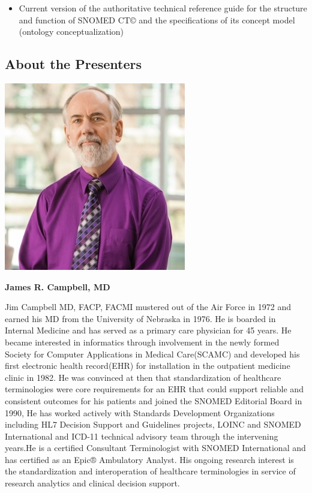 \documentclass[
]{journal}
\providecommand{\tightlist}{%
  \setlength{\itemsep}{0pt}\setlength{\parskip}{0pt}}
\begin{document}
\begin{itemize}
  \begin{itemize}
  \tightlist
  \item
    Current version of the authoritative technical reference guide for the structure and function of SNOMED CT© and the specifications of its concept model (ontology conceptualization)
  \end{itemize}
\end{itemize}

\hypertarget{about-the-presenters}{%
\subsection{About the Presenters}\label{about-the-presenters}}

\begin{flushleft}\includegraphics[width=0.5\linewidth]{assets/biography/jamescampbell} \end{flushleft}

\textbf{James R. Campbell, MD}

Jim Campbell MD, FACP, FACMI mustered out of the Air Force in 1972 and earned his MD from the University of Nebraska in 1976. He is boarded in Internal Medicine and has served as a primary care physician for 45 years. He became interested in informatics through involvement in the newly formed Society for Computer Applications in Medical Care(SCAMC) and developed his first electronic health record(EHR) for installation in the outpatient medicine clinic in 1982. He was convinced at then that standardization of healthcare terminologies were core requirements for an EHR that could support reliable and consistent outcomes for his patients and joined the SNOMED Editorial Board in 1990, He has worked actively with Standards Development Organizations including HL7 Decision Support and Guidelines projects, LOINC and SNOMED International and ICD-11 technical advisory team through the intervening years.He is a certified Consultant Terminologist with SNOMED International and has certified as an Epic® Ambulatory Analyst. His ongoing research interest is the standardization and interoperation of healthcare terminologies in service of research analytics and clinical decision support.
\end{document}

